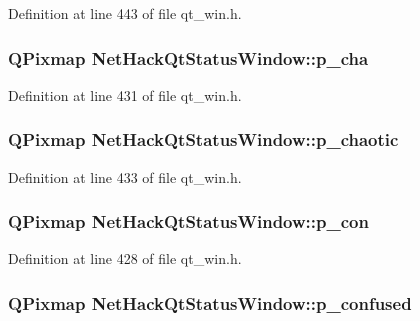 Definition at line 443 of file qt\+\_\+win.\+h.

\hypertarget{classNetHackQtStatusWindow_abf918784c0eeb462cd89d5325ef7499e}{
\subsubsection[{p\+\_\+cha}]{\setlength{\rightskip}{0pt plus 5cm}Q\+Pixmap Net\+Hack\+Qt\+Status\+Window\+::p\+\_\+cha\hspace{0.3cm}{\ttfamily [private]}}}\label{classNetHackQtStatusWindow_abf918784c0eeb462cd89d5325ef7499e}


Definition at line 431 of file qt\+\_\+win.\+h.

\hypertarget{classNetHackQtStatusWindow_a2f4fe3698d203956d5d49ee666cbe2b2}{
\subsubsection[{p\+\_\+chaotic}]{\setlength{\rightskip}{0pt plus 5cm}Q\+Pixmap Net\+Hack\+Qt\+Status\+Window\+::p\+\_\+chaotic\hspace{0.3cm}{\ttfamily [private]}}}\label{classNetHackQtStatusWindow_a2f4fe3698d203956d5d49ee666cbe2b2}


Definition at line 433 of file qt\+\_\+win.\+h.

\hypertarget{classNetHackQtStatusWindow_ae0325327747e7bad2d499ec5d597c829}{
\subsubsection[{p\+\_\+con}]{\setlength{\rightskip}{0pt plus 5cm}Q\+Pixmap Net\+Hack\+Qt\+Status\+Window\+::p\+\_\+con\hspace{0.3cm}{\ttfamily [private]}}}\label{classNetHackQtStatusWindow_ae0325327747e7bad2d499ec5d597c829}


Definition at line 428 of file qt\+\_\+win.\+h.

\hypertarget{classNetHackQtStatusWindow_a628dc95a8a1201590d3d01e1b12ca322}{
\subsubsection[{p\+\_\+confused}]{\setlength{\rightskip}{0pt plus 5cm}Q\+Pixmap Net\+Hack\+Qt\+Status\+Window\+::p\+\_\+confused\hspace{0.3cm}{\ttfamily [private]}}}\label{classNetHackQtStatusWindow_a628dc95a8a1201590d3d01e1b12ca322}



